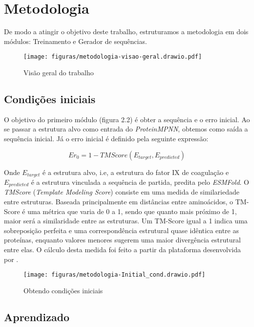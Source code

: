 
\chapter{Metodologia}

De modo a atingir o objetivo deste trabalho, estruturamos a metodologia em dois módulos: Treinamento e Gerador de sequências.
\begin{figure}[h]
  \centering
  \texttt{[image: figuras/metodologia-visao-geral.drawio.pdf]}
  \caption{Visão geral do trabalho}
\end{figure}

\section{Condições iniciais}
O objetivo do primeiro módulo (figura 2.2) é  obter a sequência e o erro inicial. 
Ao se passar a estrutura alvo como entrada do \textit{ProteinMPNN}, obtemos como saída a sequência inicial. Já o erro inicial é definido pela seguinte expressão:
 
\begin{equation}
    Er_{0} = 1 - TMScore(E_{target}, E_{predicted})
\end{equation}

\noindent
Onde $E_{target}$ é a estrutura alvo, i.e, a estrutura do fator IX de coagulação e $E_{predicted}$ é a estrutura vinculada a sequência de partida, predita pelo \textit{ESMFold}. 
O \textit{TMScore} (\textit{Template Modeling Score}) consiste em uma medida de similariedade entre estruturas. Baseada principalmente em distâncias entre aminoácidos, o TM-Score é uma métrica que varia de 0 a 1, sendo que quanto mais próximo de 1, maior será a similaridade entre as estruturas. Um TM-Score igual a 1 indica uma sobreposição perfeita e uma correspondência estrutural quase idêntica entre as proteínas, enquanto valores menores sugerem uma maior divergência estrutural entre elas. O cálculo desta medida foi feito a partir da plataforma desenvolvida por \cite{USalign}.


\begin{figure}[H]
  \centering
  \texttt{[image: figuras/metodologia-Initial\_cond.drawio.pdf]}
  \caption{Obtendo condições iniciais}
\end{figure}

\section{Aprendizado}
 
